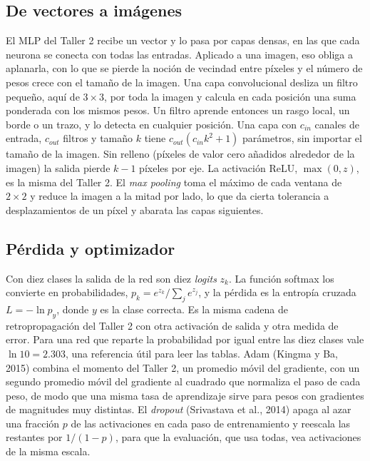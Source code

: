 \documentclass[11pt,letterpaper]{article}
\begin{document}
\subsection{De vectores a imágenes}

El MLP del Taller 2 recibe un vector y lo pasa por capas densas, en las que cada neurona se conecta con todas las entradas. Aplicado a una imagen, eso obliga a aplanarla, con lo que se pierde la noción de vecindad entre píxeles y el número de pesos crece con el tamaño de la imagen. Una capa convolucional desliza un filtro pequeño, aquí de $3\times3$, por toda la imagen y calcula en cada posición una suma ponderada con los mismos pesos. Un filtro aprende entonces un rasgo local, un borde o un trazo, y lo detecta en cualquier posición. Una capa con $c_{in}$ canales de entrada, $c_{out}$ filtros y tamaño $k$ tiene $c_{out}(c_{in}k^2+1)$ parámetros, sin importar el tamaño de la imagen. Sin relleno (píxeles de valor cero añadidos alrededor de la imagen) la salida pierde $k-1$ píxeles por eje. La activación ReLU, $\max(0, z)$, es la misma del Taller 2. El \emph{max pooling} toma el máximo de cada ventana de $2\times2$ y reduce la imagen a la mitad por lado, lo que da cierta tolerancia a desplazamientos de un píxel y abarata las capas siguientes.

\subsection{Pérdida y optimizador}

Con diez clases la salida de la red son diez \emph{logits} $z_k$. La función softmax los convierte en probabilidades, $p_k = e^{z_k}/\sum_j e^{z_j}$, y la pérdida es la entropía cruzada $L = -\ln p_y$, donde $y$ es la clase correcta. Es la misma cadena de retropropagación del Taller 2 con otra activación de salida y otra medida de error. Para una red que reparte la probabilidad por igual entre las diez clases vale $\ln 10 = 2.303$, una referencia útil para leer las tablas. Adam (Kingma y Ba, 2015) combina el momento del Taller 2, un promedio móvil del gradiente, con un segundo promedio móvil del gradiente al cuadrado que normaliza el paso de cada peso, de modo que una misma tasa de aprendizaje sirve para pesos con gradientes de magnitudes muy distintas. El \emph{dropout} (Srivastava et al., 2014) apaga al azar una fracción $p$ de las activaciones en cada paso de entrenamiento y reescala las restantes por $1/(1-p)$, para que la evaluación, que usa todas, vea activaciones de la misma escala.
\end{document}
